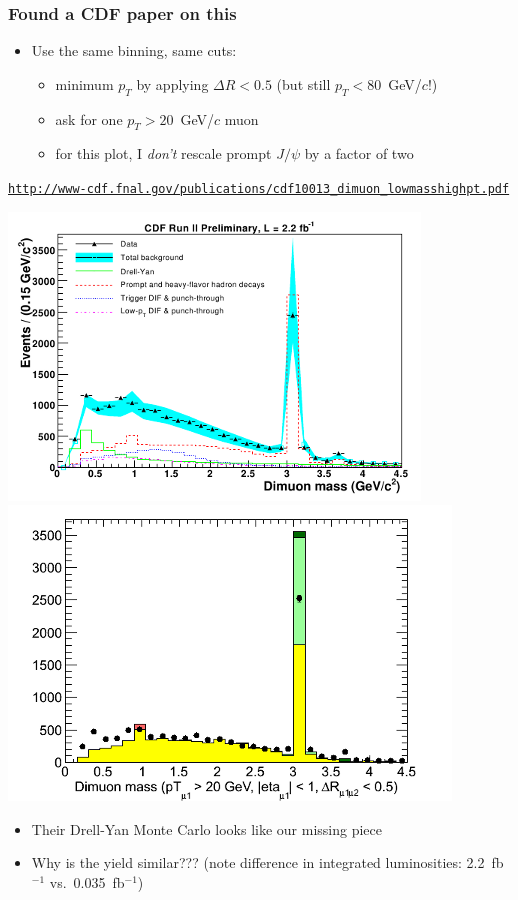 \documentclass[compress]{beamer}
\begin{document}
\begin{frame}
\frametitle{Found a CDF paper on this}

\begin{itemize}
\item Use the same binning, same cuts:
\begin{itemize}
\item minimum $p_T$ by applying $\Delta R < 0.5$ (but still $p_T < 80$~GeV/$c$!)
\item ask for one $p_T > 20$~GeV/$c$ muon
\item for this plot, I {\it don't} rescale prompt $J/\psi$ by a factor of two
\end{itemize}
\end{itemize}

{\tt \scriptsize \url{http://www-cdf.fnal.gov/publications/cdf10013\_dimuon\_lowmasshighpt.pdf}}

\vspace{0.1 cm}
\includegraphics[width=0.5\linewidth]{cdf_highpt_dimuons.png}
\includegraphics[width=0.5\linewidth]{our_highpt_dimuons.png}

\begin{itemize}
\item Their Drell-Yan Monte Carlo looks like our missing piece
\item Why is the yield similar???  (note difference in integrated luminosities: 2.2~fb$^{-1}$ vs.\ 0.035~fb$^{-1}$)
\end{itemize}

\label{numpages}
\end{frame}



\end{document}
